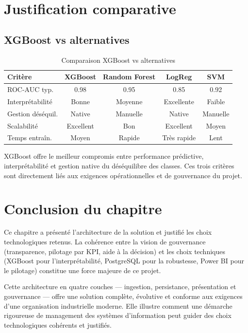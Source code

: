 \documentclass[a4paper,12pt]{report}
\begin{document}
\section{Justification comparative}

\subsection{XGBoost vs alternatives}

\begin{table}[H]
\centering
\small
\caption{Comparaison XGBoost vs alternatives}
\begin{tabular}{|l|c|c|c|c|}
\hline
\textbf{Critère} & \textbf{XGBoost} & \textbf{Random Forest} & \textbf{LogReg} & \textbf{SVM} \\
\hline\hline
ROC-AUC typ. & 0.98 & 0.95 & 0.85 & 0.92 \\
\hline
Interprétabilité & Bonne & Moyenne & Excellente & Faible \\
\hline
Gestion déséquil. & Native & Manuelle & Native & Manuelle \\
\hline
Scalabilité & Excellent & Bon & Excellent & Moyen \\
\hline
Temps entraîn. & Moyen & Rapide & Très rapide & Lent \\
\hline
\end{tabular}
\end{table}

XGBoost offre le meilleur compromis entre performance prédictive, interprétabilité et gestion native du déséquilibre des classes. Ces trois critères sont directement liés aux exigences opérationnelles et de gouvernance du projet.

\section*{Conclusion du chapitre}

Ce chapitre a présenté l'architecture de la solution et justifié les choix technologiques retenus. La cohérence entre la vision de gouvernance (transparence, pilotage par KPI, aide à la décision) et les choix techniques (XGBoost pour l'interprétabilité, PostgreSQL pour la robustesse, Power BI pour le pilotage) constitue une force majeure de ce projet.

Cette architecture en quatre couches — ingestion, persistance, présentation et gouvernance — offre une solution complète, évolutive et conforme aux exigences d'une organisation industrielle moderne. Elle illustre comment une démarche rigoureuse de management des systèmes d'information peut guider des choix technologiques cohérents et justifiés.
\end{document}
